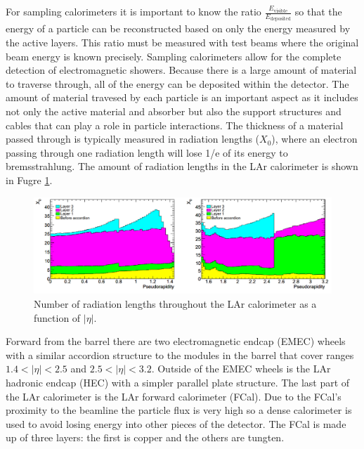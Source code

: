 For sampling calorimeters it is important to know the ratio $\frac{E_{\text{visible}}}{E_{\text{deposited}}}$ so that the energy of a particle can be reconstructed based on only the energy measured by the active layers.  This ratio must be measured with test beams where the original beam energy is known precisely.  Sampling calorimeters allow for the complete detection of electromagnetic showers.  Because there is a large amount of material to traverse through, all of the energy can be deposited within the detector. The amount of material travesed by each particle is an important aspect as it includes not only the active material and absorber but also the support structures and cables that can play a role in particle interactions.  The thickness of a material passed through is typically measured in radiation lengths ($X_0$), where an electron passing through one radiation length will lose 1/e of its energy to bremsstrahlung.  The amount of radiation lengths in the LAr calorimeter is shown in Fugre \ref{fig:MaterialBudget}.  

\begin{figure}[ht!]
	\centering
	\includegraphics[width=\columnwidth]{../ThesisImages/LHCImages/MaterialBudget.png}
	\caption[Number of radiation lengths throughout the LAr calorimeter as a function of $|\eta|$.]{Number of radiation lengths throughout the LAr calorimeter as a function of $|\eta|.$\cite{ATLAS}
	}
	\label{fig:MaterialBudget}
\end{figure}

Forward from the barrel there are two electromagnetic endcap (EMEC) wheels with a similar accordion structure to the modules in the barrel that cover ranges $1.4<|\eta|<2.5$ and $2.5<|\eta|<3.2$.  Outside of the EMEC wheels is the LAr hadronic endcap (HEC) with a simpler parallel plate structure.  The last part of the LAr calorimeter is the LAr forward calorimeter (FCal).  Due to the FCal's proximity to the beamline the particle flux is very high so a dense calorimeter is used to avoid losing energy into other pieces of the detector.  The FCal is made up of three layers: the first is copper and the others are tungten.  

